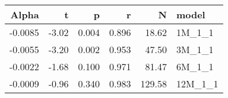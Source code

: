 \begin{table}[ht]
\centering
\begin{tabular}{rrrrrl}
  \hline
Alpha & t & p & r & N & model \\ 
  \hline
-0.0085 & -3.02 & 0.004 & 0.896 & 18.62 & 1M\_1\_1 \\ 
  -0.0055 & -3.20 & 0.002 & 0.953 & 47.50 & 3M\_1\_1 \\ 
  -0.0022 & -1.68 & 0.100 & 0.971 & 81.47 & 6M\_1\_1 \\ 
  -0.0009 & -0.96 & 0.340 & 0.983 & 129.58 & 12M\_1\_1 \\ 
   \hline
\end{tabular}
\end{table}

